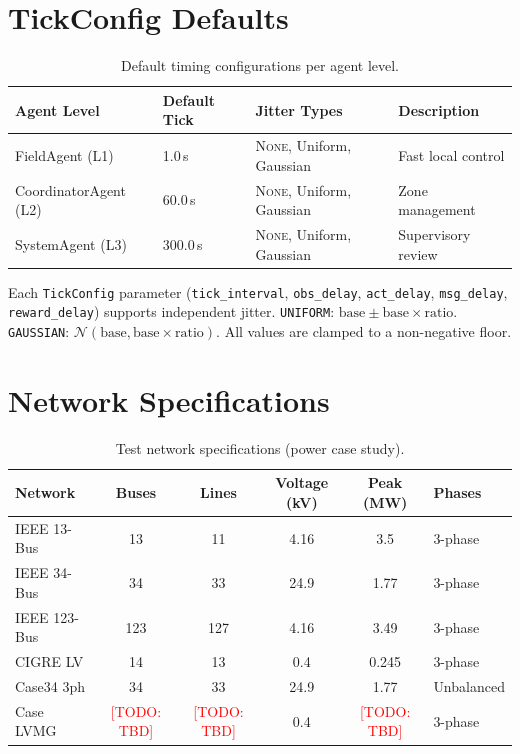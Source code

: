 \documentclass{article}
\newcommand{\todo}[1]{\textcolor{red}{[TODO: #1]}}
\begin{document}
\section{TickConfig Defaults}
\label{app:tickconfig}

\begin{table}[h]
\centering
\caption{Default timing configurations per agent level.}
\small
\begin{tabular}{@{}llll@{}}
\toprule
\textbf{Agent Level} & \textbf{Default Tick} & \textbf{Jitter Types} & \textbf{Description} \\
\midrule
FieldAgent (L1) & 1.0\,s & \textsc{None}, Uniform, Gaussian & Fast local control \\
CoordinatorAgent (L2) & 60.0\,s & \textsc{None}, Uniform, Gaussian & Zone management \\
SystemAgent (L3) & 300.0\,s & \textsc{None}, Uniform, Gaussian & Supervisory review \\
\bottomrule
\end{tabular}
\end{table}

Each \texttt{TickConfig} parameter (\texttt{tick\_interval}, \texttt{obs\_delay}, \texttt{act\_delay}, \texttt{msg\_delay}, \texttt{reward\_delay}) supports independent jitter. \texttt{UNIFORM}: $\text{base} \pm \text{base} \times \text{ratio}$. \texttt{GAUSSIAN}: $\mathcal{N}(\text{base}, \text{base} \times \text{ratio})$. All values are clamped to a non-negative floor.

\section{Network Specifications}
\label{app:networks}

\begin{table}[h]
\centering
\caption{Test network specifications (power case study).}
\small
\begin{tabular}{@{}lccccl@{}}
\toprule
\textbf{Network} & \textbf{Buses} & \textbf{Lines} & \textbf{Voltage (kV)} & \textbf{Peak (MW)} & \textbf{Phases} \\
\midrule
IEEE 13-Bus & 13 & 11 & 4.16 & 3.5 & 3-phase \\
IEEE 34-Bus & 34 & 33 & 24.9 & 1.77 & 3-phase \\
IEEE 123-Bus & 123 & 127 & 4.16 & 3.49 & 3-phase \\
CIGRE LV & 14 & 13 & 0.4 & 0.245 & 3-phase \\
Case34 3ph & 34 & 33 & 24.9 & 1.77 & Unbalanced \\
Case LVMG & \todo{TBD} & \todo{TBD} & 0.4 & \todo{TBD} & 3-phase \\
\bottomrule
\end{tabular}
\end{table}
\end{document}
